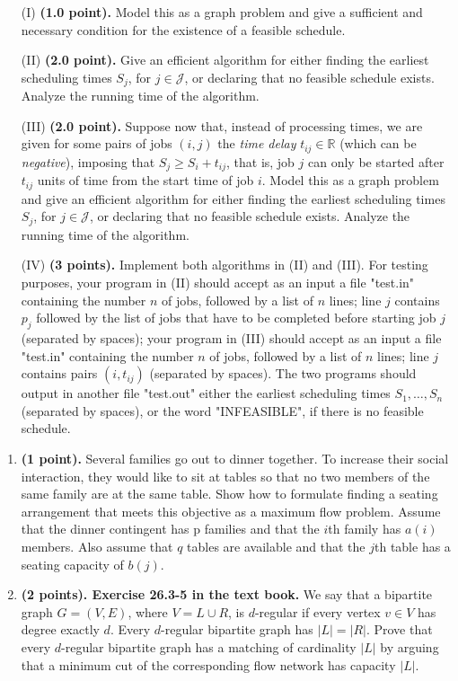 \documentclass{article}
\begin{document}
\begin{enumerate}
\item[(I)]  {\bf (1.0 point).} Model this as a graph problem and give a sufficient and necessary condition for the existence of a feasible schedule.
\item[(II)]  {\bf (2.0 point).} Give an efficient algorithm for either finding the earliest scheduling times $S_j$, for $j\in\mathcal{J}$, or declaring that no feasible schedule exists. Analyze the running time of the algorithm.
\item[(III)] {\bf (2.0 point).} Suppose now that, instead of processing times, we are given for some pairs of jobs $(i,j)$ the {\it time delay} $t_{ij}\in\mathbb{R}$ (which can be {\it negative}),  imposing that $S_j\ge S_i+t_{ij}$, that is, job $j$ can only be started after $t_{ij}$ units of time from the start time of job $i$. Model this as a graph problem and give an efficient algorithm for either finding the earliest scheduling times $S_j$, for $j\in\mathcal{J}$, or declaring that no feasible schedule exists. Analyze the running time of the algorithm.
\item[(IV)]  {\bf (3 points).} Implement both algorithms in (II) and (III). For testing purposes, your program in (II) should accept as an input a file "test.in" containing the number $n$ of jobs, followed by a list of $n$ lines; line $j$ contains $p_j$ followed by the list of jobs that have to be completed before starting job $j$ (separated by spaces);
your program in (III) should accept as an input a file "test.in" containing the number $n$ of jobs, followed by a list of $n$ lines; line $j$ contains pairs $(i,t_{ij})$ (separated by spaces).
The two programs should output in another file "test.out" either the earliest scheduling times $S_1,\ldots,S_n$ (separated by spaces), or the word "INFEASIBLE", if there is no feasible schedule.
\end{enumerate}

\medskip

\begin{enumerate}
\item {\bf (1 point).} Several families go out to dinner together. To increase their social interaction, they would like to sit at tables so that no two members of the same family are at the same table.
Show how to formulate finding a seating arrangement that meets this objective as a maximum flow problem. Assume that the dinner contingent has p families and that the $i$th family has $a(i)$
members. Also assume that $q$ tables are available and that the $j$th table has a seating capacity of $b(j)$.
\item {\bf (2 points). Exercise 26.3-5 in the text book.} We say that a bipartite graph $G=(V,E)$, where $V=L\cup R$, is $d$-regular
if every vertex $v\in V$ has degree exactly $d$. Every
$d$-regular bipartite graph has $|L| = |R|$. Prove that every $d$-regular bipartite graph
has a matching of cardinality $|L|$ by arguing that a minimum cut of the
corresponding flow network has capacity $|L|$.
\end{enumerate}
\end{document}
